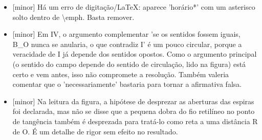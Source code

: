 \documentclass{article}%
\begin{document}
\begin{itemize}%
\item%
{[}minor{]} Há um erro de digitação/LaTeX: aparece 'horário*' com um asterisco solto dentro de \textbackslash{}emph. Basta remover.%
\item%
{[}minor{]} Em IV, o argumento complementar 'se os sentidos fossem iguais, B\_O nunca se anularia, o que contradiz I' é um pouco circular, porque a veracidade de I já depende dos sentidos opostos. Como o argumento principal (o sentido do campo depende do sentido de circulação, lido na figura) está certo e vem antes, isso não compromete a resolução. Também valeria comentar que o 'necessariamente' bastaria para tornar a afirmativa falsa.%
\item%
{[}minor{]} Na leitura da figura, a hipótese de desprezar as aberturas das espiras foi declarada, mas não se disse que a pequena dobra do fio retilíneo no ponto de tangência também é desprezada para tratá{-}lo como reta a uma distância R de O. É um detalhe de rigor sem efeito no resultado.%
\end{itemize}%
\end{document}
